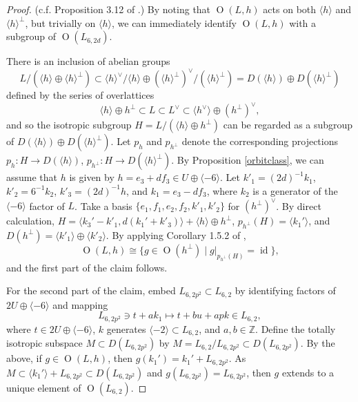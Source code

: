 \documentclass[11pt]{amsart}
\newcommand{\ZZ}{\mathbb{Z}}
\newcommand{\la}{\langle}
\newcommand{\ra}{\rangle}
\newcommand{\opn}{\operatorname}
\newcommand{\op}{\oplus}
\begin{document}
\begin{proof} 
(c.f. Proposition 3.12  of \cite{ModuliSpacesOfIrreducibleSymplecticManifolds}.)
By noting that $\opn{O}(L, h)$ acts on both $\la h \ra$ and $\la h \ra^{\perp}$, but trivially on $\la h \ra$,  we can immediately identify $\opn{O}(L, h)$ with a subgroup of $\opn{O}(L_{6,2d})$.

There is an inclusion of abelian groups
\begin{equation*}
L/(\la h \ra \op \la h \ra^{\perp})  \subset \la h \ra^{\vee} / \la h \ra \op (\la h \ra^{\perp})^{\vee} / (\la h \ra^{\perp}) = D(\la h \ra) \op D(\la h \ra^{\perp})
\end{equation*}
defined by the series of overlattices
\begin{equation*}
\la h \ra \oplus h^{\perp} \subset L \subset L^{\vee} \subset \la h^{\vee} \ra \oplus (h^{\perp})^{\vee},
\end{equation*}
and so the isotropic subgroup $H = L / ( \la h \ra \oplus h^{\perp})$ can be regarded as a subgroup of $D(\la h \ra) \op D( \la h \ra^{\perp})$. 
Let $p_h$ and $p_{h^{\perp}}$ denote the  corresponding projections $p_h: H \rightarrow D(\la h \ra)$, $p_{h^{\perp}}:H \rightarrow D(\la h \ra^{\perp})$.
By Proposition \ref{orbitclass}, we can assume that $h$ is given by $h = e_3 + d f_3 \in U \oplus \la -6 \ra$.
Let $k'_1 = (2d)^{-1}k_1$, $k'_2 = 6^{-1}k_2$, $k'_3 = (2d)^{-1}h$, and $k_1 = e_3 - df_3$,  where $k_2$ is a generator of the $\la -6 \ra$ factor of $L$.
Take a basis $\{e_1, f_1, e_2, f_2, k'_1, k'_2 \}$ for $(h^{\perp})^{\vee}$.
By direct calculation, $H = \la k_3' - k'_1, d(k_1' + k'_3) \ra +  \la h \ra \oplus h^{\perp}$, $p_{h^{\perp}}(H) = \la k_1' \ra$, and $D(h^{\perp}) = \la k'_1 \ra \oplus \la k'_2 \ra$.
By applying Corollary 1.5.2 of \cite{Nikulin}, 
\begin{equation*}
\opn{O}(L, h) \cong \{ g \in \opn{O}(h^{\perp}) \mid  g \vert _{p_{h^{\perp}}(H)} = \opn{id} \}, 
\end{equation*}
and the first part of the claim follows.

For the second part of the claim, embed $L_{6, 2p^2} \subset L_{6,2}$ by identifying factors of $2U \op \la -6 \ra$ and mapping
\begin{equation*}
L_{6,2p^2} \ni t + ak_1 \mapsto t + bu + apk \in L_{6,2},
\end{equation*} 
where $t \in 2U \op \la -6 \ra$, $k$ generates $\la -2 \ra \subset L_{6,2}$, and $a, b \in \ZZ$.
Define the totally isotropic subspace $M \subset D(L_{6,2p^2})$ by $M = L_{6, 2} / L_{6, 2p^2} \subset D(L_{6, 2p^2})$. 
By the above, if $g \in \opn{O}(L, h)$, then $g(k_1') = k_1'+ L_{6,2p^2}$. 
As $M \subset \la k_1' \ra + L_{6,2p^2} \subset D(L_{6,2p^2})$ and $g(L_{6,2p^2}) = L_{6,2p^2}$, then $g$ extends to a unique element of $\opn{O}(L_{6,2})$.
\end{proof}
\end{document}
